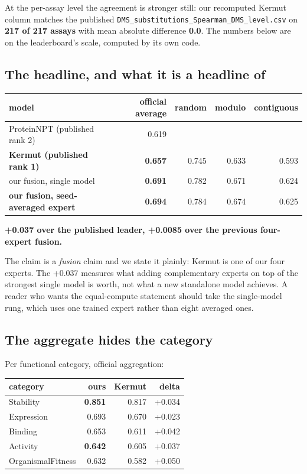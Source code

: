 \documentclass[sigconf,review,nonacm]{acmart}
\begin{document}
At the per-assay level the agreement is stronger still: our recomputed Kermut column matches the
published \texttt{DMS\_substitutions\_Spearman\_DMS\_level.csv} on \textbf{217 of 217 assays} with mean absolute
difference \textbf{0.0}. The numbers below are on the leaderboard's scale, computed by its own code.

\subsection{The headline, and what it is a headline of}\label{the-headline-and-what-it-is-a-headline-of}

\begin{table}[t]
\centering
\small
\begin{tabular}{lrrrr}
\hline
model & official average & random & modulo & contiguous \\
\hline
ProteinNPT (published rank 2) & 0.619 &  &  &  \\
\textbf{Kermut \cite{kermut} (published rank 1)} & \textbf{0.657} & 0.745 & 0.633 & 0.593 \\
our fusion, single model & \textbf{0.691} & 0.782 & 0.671 & 0.624 \\
\textbf{our fusion, seed-averaged expert} & \textbf{0.694} & 0.784 & 0.674 & 0.625 \\
\hline
\end{tabular}
\end{table}

\textbf{+0.037 over the published leader, +0.0085 over the previous four-expert fusion.}

The claim is a \emph{fusion} claim and we state it plainly: Kermut is one of our four experts. The +0.037
measures what adding complementary experts on top of the strongest single model is worth, not what a new
standalone model achieves. A reader who wants the equal-compute statement should take the single-model
rung, which uses one trained expert rather than eight averaged ones.

\subsection{The aggregate hides the category}\label{the-aggregate-hides-the-category}

Per functional category, official aggregation:

\begin{table}[t]
\centering
\small
\begin{tabular}{lrrr}
\hline
category & ours & Kermut & delta \\
\hline
Stability & \textbf{0.851} & 0.817 & +0.034 \\
Expression & 0.693 & 0.670 & +0.023 \\
Binding & 0.653 & 0.611 & +0.042 \\
Activity & \textbf{0.642} & 0.605 & +0.037 \\
OrganismalFitness & 0.632 & 0.582 & +0.050 \\
\hline
\end{tabular}
\end{table}
\end{document}
